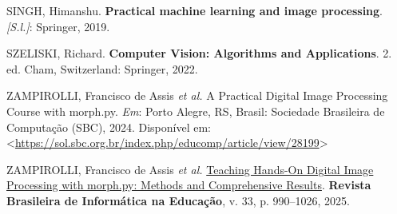 \documentclass[
  portuguese,
  letterpaper,
  openany,
  oneside,
  12pt,
  a4paper]{book}
\newlength{\cslhangindent}
\newenvironment{CSLReferences}[2] %
 {\begin{list}{}{%
  \setlength{\itemindent}{0pt}
  \setlength{\leftmargin}{0pt}
  \setlength{\parsep}{0pt}
  \ifodd #1
   \setlength{\leftmargin}{\cslhangindent}
   \setlength{\itemindent}{-1\cslhangindent}
  \fi
  \setlength{\itemsep}{#2\baselineskip}}}
 {\end{list}}
\begin{document}
\begin{tcolorbox}
\begin{CSLReferences}{0}{1}
SINGH, Himanshu. \textbf{Practical machine learning and image
processing}. \emph{{[}S.l.{]}}: Springer, 2019.

SZELISKI, Richard. \textbf{Computer Vision: Algorithms and
Applications}. 2. ed. Cham, Switzerland: Springer, 2022.

ZAMPIROLLI, Francisco de Assis \emph{et al.} A Practical Digital Image
Processing Course with morph.py. \emph{Em}: Porto Alegre, RS, Brasil:
Sociedade Brasileira de Computação (SBC), 2024. Disponível em:
\textless{}\url{https://sol.sbc.org.br/index.php/educomp/article/view/28199}\textgreater{}

ZAMPIROLLI, Francisco de Assis \emph{et al.}
\href{https://doi.org/10.5753/rbie.2025.5009}{Teaching Hands-On Digital
Image Processing with morph.py: Methods and Comprehensive Results}.
\textbf{Revista Brasileira de Informática na Educação}, v. 33, p.
990--1026, 2025.

\end{CSLReferences}

\end{tcolorbox}


\backmatter
\end{document}
